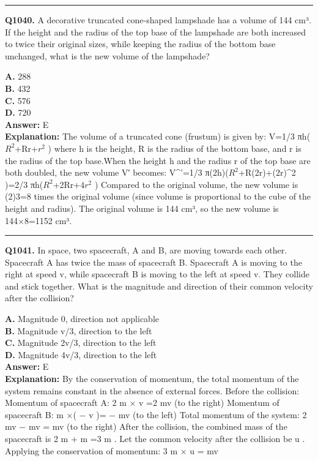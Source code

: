 \documentclass[12pt]{article}
\begin{document}
\hrule
\vspace{1em}


\noindent
\textbf{Q1040.} A decorative truncated cone-shaped lampshade has a volume of 144 cm³. If the height and the radius of the top base of the lampshade are both increased to twice their original sizes, while keeping the radius of the bottom base unchanged, what is the new volume of the lampshade?



\textbf{A.} 288 \\
\textbf{B.} 432 \\
\textbf{C.} 576 \\
\textbf{D.} 720 \\

\textbf{Answer:} E \\
\textbf{Explanation:} The volume of a truncated cone (frustum) is given by: V=1/3 πh($R^2$+Rr+$r^2$ )
where h is the height, R is the radius of the bottom base, and r is the radius of the top base.When the height h and the radius r of the top base are both doubled, the new volume V′ becomes: V^'=1/3 π(2h)($R^2$+R(2r)+(2r)^2 )=2/3 πh($R^2$+2Rr+$4r^2$ )
Compared to the original volume, the new volume is (2)3=8 times the original volume (since volume is proportional to the cube of the height and radius).
The original volume is 144 cm³, so the new volume is 144×8=1152 cm³.

\hrule
\vspace{1em}


\noindent
\textbf{Q1041.} In space, two spacecraft, A and B, are moving towards each other. Spacecraft A has twice the mass of spacecraft B. Spacecraft A is moving to the right at speed v, while spacecraft B is moving to the left at speed v. They collide and stick together. What is the magnitude and direction of their common velocity after the collision?



\textbf{A.} Magnitude 0, direction not applicable \\
\textbf{B.} Magnitude v/3, direction to the left \\
\textbf{C.} Magnitude 2v/3, direction to the left \\
\textbf{D.} Magnitude 4v/3, direction to the left \\

\textbf{Answer:} E \\
\textbf{Explanation:} By the conservation of momentum, the total momentum of the system remains constant in the absence of external forces. Before the collision:
Momentum of spacecraft A: 2
m
×
v
=2
mv
(to the right)
Momentum of spacecraft B:
m
×(
−
v
)=
−
mv
(to the left)
Total momentum of the system: 2
mv
−
mv
=
mv
(to the right)
After the collision, the combined mass of the spacecraft is 2
m
+
m
=3
m
. Let the common velocity after the collision be
u
. Applying the conservation of momentum:
3
m
×
u
=
mv
\end{document}
